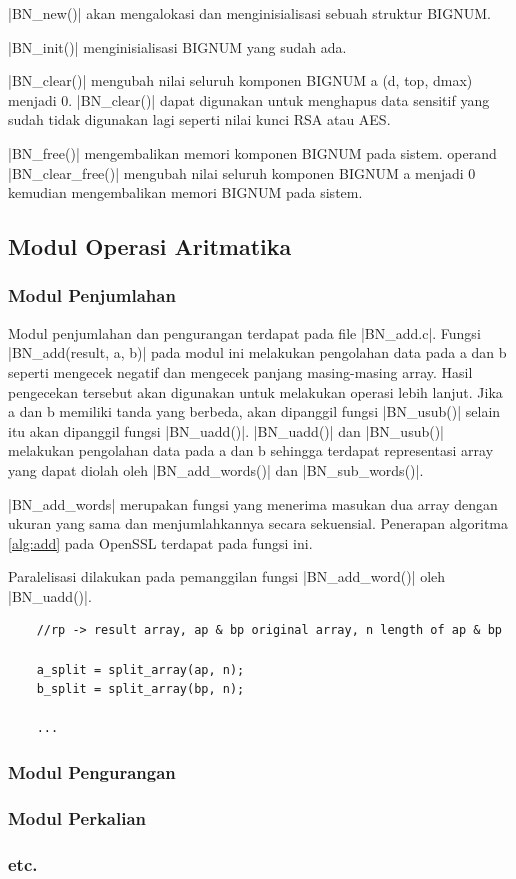 |BN_new()| akan mengalokasi dan menginisialisasi sebuah struktur BIGNUM.

|BN_init()| menginisialisasi BIGNUM yang sudah ada.

|BN_clear()| mengubah nilai seluruh komponen BIGNUM a (d, top, dmax) menjadi 0. |BN_clear()| dapat digunakan untuk menghapus data sensitif yang sudah tidak digunakan lagi seperti nilai kunci RSA atau AES.

|BN_free()| mengembalikan memori komponen BIGNUM pada sistem.
operand
|BN_clear_free()| mengubah nilai seluruh komponen BIGNUM a menjadi 0 kemudian mengembalikan memori BIGNUM pada sistem.

\subsection{Modul Operasi Aritmatika}
\subsubsection{Modul Penjumlahan}
Modul penjumlahan dan pengurangan terdapat pada file |BN_add.c|. Fungsi |BN_add(result, a, b)| pada modul ini melakukan pengolahan data pada a dan b seperti mengecek negatif dan mengecek panjang masing-masing array. Hasil pengecekan tersebut akan digunakan untuk melakukan operasi lebih lanjut. Jika a dan b memiliki tanda yang berbeda, akan dipanggil fungsi |BN_usub()| selain itu akan dipanggil fungsi |BN_uadd()|. |BN_uadd()| dan |BN_usub()| melakukan pengolahan data pada a dan b sehingga terdapat representasi array yang dapat diolah oleh |BN_add_words()| dan |BN_sub_words()|.

|BN_add_words| merupakan fungsi yang menerima masukan dua array dengan ukuran yang sama dan menjumlahkannya secara sekuensial. Penerapan algoritma \ref{alg:add} pada OpenSSL terdapat pada fungsi ini.

Paralelisasi dilakukan pada pemanggilan fungsi |BN_add_word()| oleh |BN_uadd()|. 

\begin{lstlisting}
    //rp -> result array, ap & bp original array, n length of ap & bp

    a_split = split_array(ap, n);
    b_split = split_array(bp, n);

    ...

\end{lstlisting}



\subsubsection{Modul Pengurangan}
\subsubsection{Modul Perkalian}
\subsubsection{etc.}
